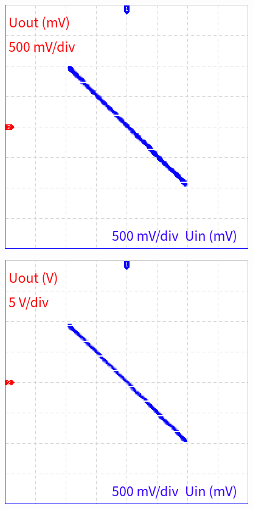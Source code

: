 \documentclass{protokol}
\begin{document}
		\begin{figure}
			\centering
			\begin{minipage}{.45\textwidth}
				\centering
				\includegraphics[width=\linewidth]{oscilo/output14.png}
				\label{fig:i-l-prevodni-1k}
			\end{minipage}%
			\hspace{.09\textwidth}
			\begin{minipage}{.45\textwidth}
				\centering
				\includegraphics[width=\linewidth]{oscilo/output15.png}
				\label{fig:i-l-prevodni-10k}
			\end{minipage}
		\end{figure}
		
\end{document}
